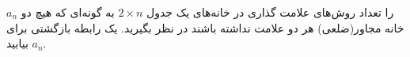 \EXERCISE
$a_n$
 را تعداد روش‌های علامت گذاری در خانه‌های یک جدول
$2 \times n$
به گونه‌ای که هیچ دو خانه مجاور(ضلعی) هر دو علامت نداشته باشند در نظر بگیرید. یک رابطه بازگشتی برای
$a_n$
بیابید.